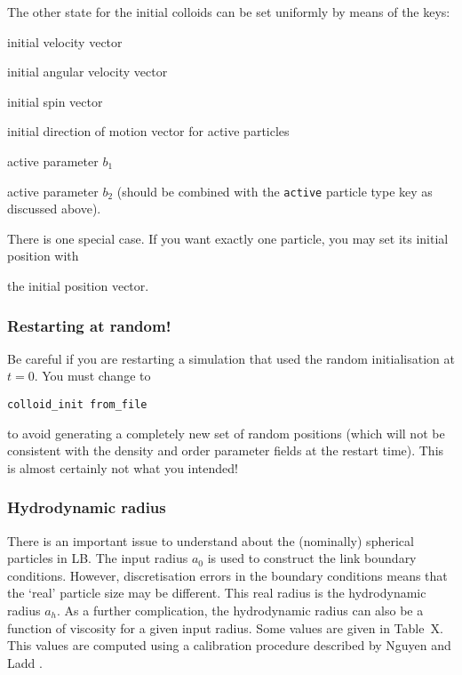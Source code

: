 The other state for the initial colloids can be set uniformly by
means of the keys:

 initial velocity vector

 initial angular velocity vector

 initial spin vector

 initial direction of motion vector for active
particles

 active parameter $b_1$

 active parameter $b_2$ (should be combined
with the \texttt{active} particle type key as discussed above).

There is one special case. If you want exactly one particle, you may
set its initial position with

 the initial position vector.

\subsubsection{Restarting at random!}

Be careful if you are restarting a simulation that used the random
initialisation at $t=0$. You must change to 

\texttt{colloid\_init  from\_file}

to avoid generating a completely new set of random positions
(which will not be consistent with the density and order parameter
fields at the restart time). This is almost certainly not what you
intended!

\subsubsection{Hydrodynamic radius}

There is an important issue to understand about the (nominally)
spherical particles in LB. The input radius $a_0$ is used to
construct the link boundary conditions. However, discretisation
errors in the boundary conditions means that the `real' particle
size may be different. This real radius is the hydrodynamic radius $a_h$.
As a further complication, the hydrodynamic radius can also
be a function of viscosity for a given input radius. Some values
are given in Table~X. This values are computed using a calibration
procedure described by Nguyen and Ladd \cite{nguyen2001}.

